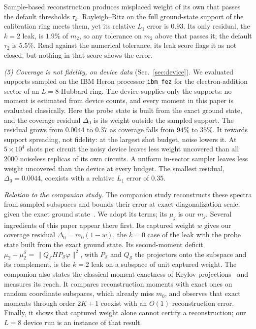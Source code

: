 \documentclass[submission, PhysCore]{SciPost}
\begin{document}
Sample-based reconstruction produces misplaced weight of its own that passes the default thresholds $\tau_k$. Rayleigh--Ritz on the full ground-state support of the calibration ring meets them, yet its relative $L_1$ error is $0.93$. Its only residual, the $k=2$ leak, is $1.9\%$ of $m_2$, so any tolerance on $m_2$ above that passes it; the default $\tau_2$ is $5.5\%$. Read against the numerical tolerance, its leak score flags it as not closed, but nothing in that score shows the error.

\emph{(5) Coverage is not fidelity, on device data} (Sec.~\ref{sec:device}). We evaluated supports sampled on the IBM Heron processor \texttt{ibm\_fez} for the electron-addition sector of an $L=8$ Hubbard ring. The device supplies only the supports: no moment is estimated from device counts, and every moment in this paper is evaluated classically. Here the probe state is built from the exact ground state, and the coverage residual $\Delta_0$ is its weight outside the sampled support. The residual grows from $0.0044$ to $0.37$ as coverage falls from $94\%$ to $35\%$. It rewards support spreading, not fidelity: at the largest shot budget, noise lowers it. At $5\times10^4$ shots per circuit the noisy device leaves less weight uncovered than all $2000$ noiseless replicas of its own circuits. A uniform in-sector sampler leaves less weight uncovered than the device at every budget. The smallest residual, $\Delta_0=0.0044$, coexists with a relative $L_1$ error of $0.35$.

\emph{Relation to the companion study.} The companion study reconstructs these spectra from sampled subspaces and bounds their error at exact-diagonalization scale, given the exact ground state~\cite{SQDspec2608}. We adopt its terms; its $\mu_j$ is our $m_j$. Several ingredients of this paper appear there first. Its captured weight $w$ gives our coverage residual $\Delta_0=m_0(1-w)$, the $k=0$ case of the leak with the probe state built from the exact ground state. Its second-moment deficit $\mu_2-\mu_2^{\mathcal S}=\lVert Q_{\mathcal S}HP_{\mathcal S}\varphi\rVert^2$, with $P_\mathcal S$ and $Q_\mathcal S$ the projectors onto the subspace and its complement, is the $k=2$ leak on a subspace of unit captured weight. The companion also states the classical moment exactness of Krylov projections~\cite{GM2010} and measures its reach. It compares reconstruction moments with exact ones on random coordinate subspaces, which already miss $m_0$, and observes that exact moments through order $2K+1$ coexist with an $O(1)$ reconstruction error. Finally, it shows that captured weight alone cannot certify a reconstruction; our $L=8$ device run is an instance of that result.
\end{document}
